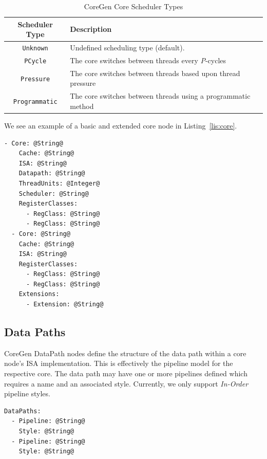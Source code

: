 \documentclass{article}
\begin{document}
\begin{table}[h]
\begin{center}
\caption{CoreGen Core Scheduler Types}
\vspace{0.125in}
\label{tab:SchedTypes}
\begin{tabular}{|c|l|}
\hline
\textbf{Scheduler Type} & \textbf{Description}\\
\hline
\texttt{Unknown} & Undefined scheduling type (default).\\
\hline
\texttt{PCycle} & The core switches between threads every \textit{P}-cycles\\
\hline
\texttt{Pressure} & The core switches between threads based upon thread pressure\\
\hline
\texttt{Programmatic} & The core switches between threads using a programmatic method\\
\hline
\end{tabular}
\end{center}
\end{table}

\clearpage
We see an example of a basic and extended core node in Listing~\ref{lis:core}.   

\vspace{0.125in}
\begin{lstlisting}[frame=single,style=base,caption={Core Node Definition},captionpos=b,label={lis:core}]
- Core: @String@
    Cache: @String@
    ISA: @String@
    Datapath: @String@
    ThreadUnits: @Integer@
    Scheduler: @String@
    RegisterClasses:
      - RegClass: @String@
      - RegClass: @String@
  - Core: @String@
    Cache: @String@
    ISA: @String@
    RegisterClasses:
      - RegClass: @String@
      - RegClass: @String@
    Extensions:
      - Extension: @String@
\end{lstlisting}

\clearpage
\subsection{Data Paths}
\label{sec:DataPathNodes}

CoreGen DataPath nodes define the structure of the data path within a core node's 
ISA implementation.  This is effectively the pipeline model for the respective core.  The data path 
may have one or more pipelines defined which requires a name and an associated style.  Currently, 
we only support \textit{In-Order} pipeline styles.

\vspace{0.125in}
\begin{lstlisting}[frame=single,style=base,caption={Data Path Node Definition},captionpos=b,label={lis:datapath}]
DataPaths:
  - Pipeline: @String@
    Style: @String@
  - Pipeline: @String@
    Style: @String@
\end{lstlisting}
\end{document}
